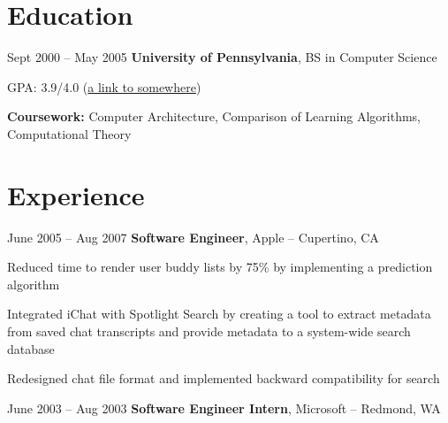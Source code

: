 	\section{Education}
	
	
	
	
	\begin{twocolentry}{
			Sept 2000 – May 2005
		}
		\textbf{University of Pennsylvania}, BS in Computer Science\end{twocolentry}
	
	\vspace{0.10 cm}
	\begin{onecolentry}
		\begin{highlights}
			\item GPA: 3.9/4.0 (\href{https://example.com}{a link to somewhere})
			\item \textbf{Coursework:} Computer Architecture, Comparison of Learning Algorithms, Computational Theory
		\end{highlights}
	\end{onecolentry}
	
	
	
	
	\section{Experience}
	
	
	
	
	\begin{twocolentry}{
			June 2005 – Aug 2007
		}
		\textbf{Software Engineer}, Apple -- Cupertino, CA\end{twocolentry}
	
	\vspace{0.10 cm}
	\begin{onecolentry}
		\begin{highlights}
			\item Reduced time to render user buddy lists by 75\% by implementing a prediction algorithm
			\item Integrated iChat with Spotlight Search by creating a tool to extract metadata from saved chat transcripts and provide metadata to a system-wide search database
			\item Redesigned chat file format and implemented backward compatibility for search
		\end{highlights}
	\end{onecolentry}
	
	
	\vspace{0.2 cm}
	
	\begin{twocolentry}{
			June 2003 – Aug 2003
		}
		\textbf{Software Engineer Intern}, Microsoft -- Redmond, WA\end{twocolentry}
	
